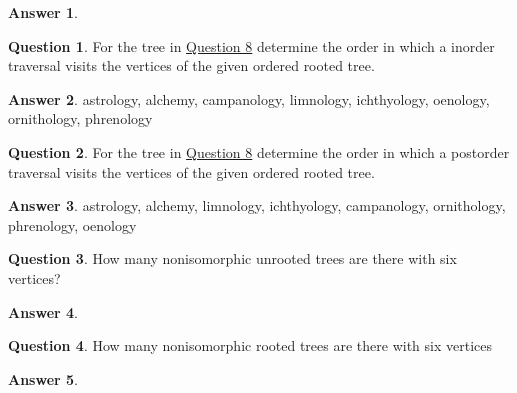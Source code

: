 \documentclass[article, 12pt]{article}
\theoremstyle{definition}
\newtheorem{question}{Question}
\newtheorem{answer}{Answer}
\begin{document}
    \begin{answer} \
        \label{a8}
        \begin{figure}[H]
            \centering
        \end{figure}
    \end{answer}

    \begin{question}
        \label{q9}
        For the tree in \hyperref[a8]{Question 8} determine the order in which a inorder traversal visits the vertices of the given ordered rooted tree.    
    \end{question}

    \begin{answer}
        \label{a9}
        astrology, alchemy, campanology, limnology, ichthyology, oenology, ornithology, phrenology
    \end{answer}

    \begin{question}
        \label{q10}
        For the tree in \hyperref[a8]{Question 8} determine the order in which a postorder traversal visits the vertices of the given ordered rooted tree.
    \end{question}

    \begin{answer}
        \label{a10}
        astrology, alchemy, limnology, ichthyology, campanology, ornithology, phrenology, oenology
    \end{answer}

    \begin{question}
        \label{q11}
        How many nonisomorphic unrooted trees are there with six vertices?
    \end{question}

    \begin{answer}
        \label{a11}
    \end{answer}

    \begin{question}
        \label{q12}
        How many nonisomorphic rooted trees are there with six vertices    
    \end{question}

    \begin{answer}
        \label{a12}
    \end{answer}
\end{document}
